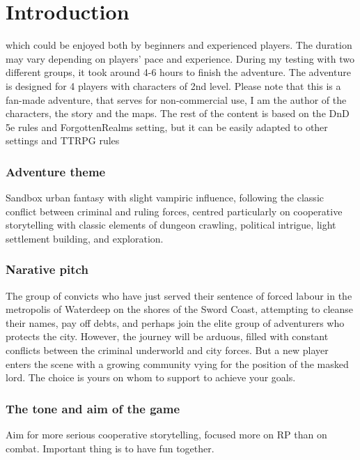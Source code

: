 \documentclass[10pt,twocolumn,twoside,openany,bg=full,layout=true,nomultitoc]{dndbook}
\begin{document}
\tableofcontents

\mainmatter

\chapter{Introduction}\label{ch:introduction}
which could be enjoyed both by beginners and experienced players.
The duration may vary depending on players' pace and experience.
During my testing with two different groups, it took around 4-6 hours to finish the adventure.
The adventure is designed for 4 players with characters of 2nd level.
Please note that this is a fan-made adventure, that serves for non-commercial use, I am the author of the characters,
the story and the maps.
The rest of the content is based on the DnD 5e rules and ForgottenRealms setting, but it can be easily adapted to other
settings and TTRPG rules


\subsection*{Adventure theme}
Sandbox urban fantasy with slight vampiric influence, following the classic conflict between criminal and ruling forces,
centred particularly on cooperative storytelling with classic elements of dungeon crawling, political intrigue, light settlement building, and exploration.

\subsection*{Narative pitch}
The group of convicts who have just served their sentence of forced labour in the metropolis of Waterdeep on the shores of the Sword Coast,
attempting to cleanse their names, pay off debts, and perhaps join the elite group of adventurers who protects the city.
However, the journey will be arduous, filled with constant conflicts between the criminal underworld and city forces.
But a new player enters the scene with a growing community vying for the position of the masked lord.
The choice is yours on whom to support to achieve your goals.

\subsection*{The tone and aim of the game}
Aim for more serious cooperative storytelling, focused more on RP than on combat.
Important thing is to have fun together.
\end{document}
